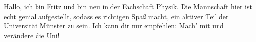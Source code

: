 \begin{multicols*}{2}
{Hallo, ich bin Fritz und bin neu in der Fachschaft Physik.
Die Mannschaft hier ist echt genial aufgestellt, sodass es richtigen Spaß macht, ein aktiver Teil der Universität Münster zu sein.
Ich kann dir nur empfehlen: Mach' mit und verändere die Uni!}
\end{multicols*}
